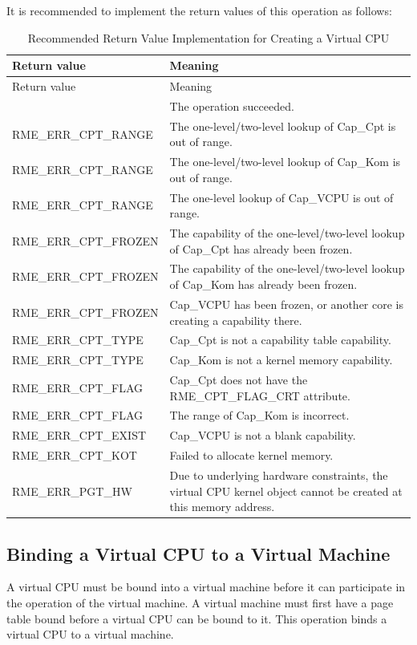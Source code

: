 It is recommended to implement the return values of this operation as follows:

\begin{xltabular}{\textwidth}{@{}>{\hsize\raggedright\arraybackslash}X>{\hsize\raggedright\arraybackslash}X@{}}
\caption{Recommended Return Value Implementation for Creating a Virtual CPU}\label{tab:8-82-create-virtual-cpu-suggested-return-values}\\
\toprule
Return value & Meaning\tabularnewline
\endfirsthead
\toprule
Return value & Meaning\tabularnewline
\midrule
\endhead
\bottomrule
{} & The operation succeeded.\tabularnewline
    RME\_ERR\_CPT\_RANGE & The one-level/two-level lookup of Cap\_Cpt is out of range.\tabularnewline
    RME\_ERR\_CPT\_RANGE & The one-level/two-level lookup of Cap\_Kom is out of range.\tabularnewline
    RME\_ERR\_CPT\_RANGE & The one-level lookup of Cap\_VCPU is out of range.\tabularnewline
    RME\_ERR\_CPT\_FROZEN & The capability of the one-level/two-level lookup of Cap\_Cpt has already been frozen.\tabularnewline
    RME\_ERR\_CPT\_FROZEN & The capability of the one-level/two-level lookup of Cap\_Kom has already been frozen.\tabularnewline
    RME\_ERR\_CPT\_FROZEN & Cap\_VCPU has been frozen, or another core is creating a capability there.\tabularnewline
    RME\_ERR\_CPT\_TYPE & Cap\_Cpt is not a capability table capability.\tabularnewline
    RME\_ERR\_CPT\_TYPE & Cap\_Kom is not a kernel memory capability.\tabularnewline
    RME\_ERR\_CPT\_FLAG & Cap\_Cpt does not have the RME\_CPT\_FLAG\_CRT attribute.\tabularnewline
    RME\_ERR\_CPT\_FLAG & The range of Cap\_Kom is incorrect.\tabularnewline
    RME\_ERR\_CPT\_EXIST & Cap\_VCPU is not a blank capability.\tabularnewline
    RME\_ERR\_CPT\_KOT & Failed to allocate kernel memory.\tabularnewline
    RME\_ERR\_PGT\_HW & Due to underlying hardware constraints, the virtual CPU kernel object cannot be created at this memory address.\tabularnewline
\end{xltabular}
\nopagebreak[4]

\subsection{Binding a Virtual CPU to a Virtual Machine}\label{subsec:8-bind-virtual-cpu-to-virtual-machine}

A virtual CPU must be bound into a virtual machine before it can participate in the operation of the virtual machine. A virtual machine must first have a page table bound before a virtual CPU can be bound to it. This operation binds a virtual CPU to a virtual machine.

